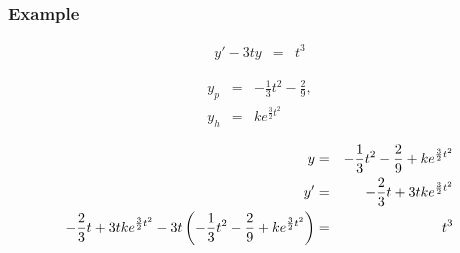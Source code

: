 \begin{frame}
  \frametitle{Example}

  \begin{eqnarray*}
    y' - 3ty & = & t^3
  \end{eqnarray*}

  \begin{eqnarray*}
    y_p & = & -\frac{1}{3} t^2 - \frac{2}{9}, \\
    y_h & = & k e^{\frac{3}{2}t^2}
  \end{eqnarray*}

  \begin{eqnarray*}
    y & = & -\frac{1}{3} t^2 - \frac{2}{9} + k e^{\frac{3}{2}t^2} \\
    y' & = & -\frac{2}{3} t + 3t k e^{\frac{3}{2}t^2} \\
    -\frac{2}{3} t + 3t k e^{\frac{3}{2}t^2} - 3t \left( -\frac{1}{3} t^2 - \frac{2}{9} + k e^{\frac{3}{2}t^2} \right) & = & t^3
  \end{eqnarray*}

\end{frame}


